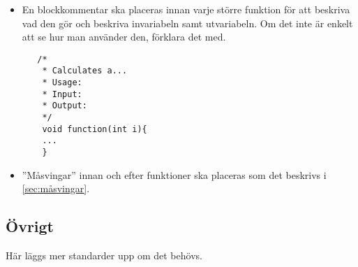 \documentclass[a4paper]{article}
\begin{document}
    \begin{itemize}
    
    \item En blockkommentar ska placeras innan varje större funktion för att beskriva vad den gör och beskriva invariabeln samt utvariabeln. Om det inte är enkelt att se hur man använder den, förklara det med.
    
    \begin{lstlisting}
   /*
    * Calculates a...
    * Usage: 
    * Input: 
    * Output: 
    */
    void function(int i){
    ...
    }
    \end{lstlisting}
    
    \item ''Måsvingar'' innan och efter funktioner ska placeras som det beskrivs i \ref{sec:måsvingar}.
    
    \end{itemize}
    
    \subsection{Övrigt}
    Här läggs mer standarder upp om det behövs.
    
\newpage

\label{reflist}

    
\end{document}
